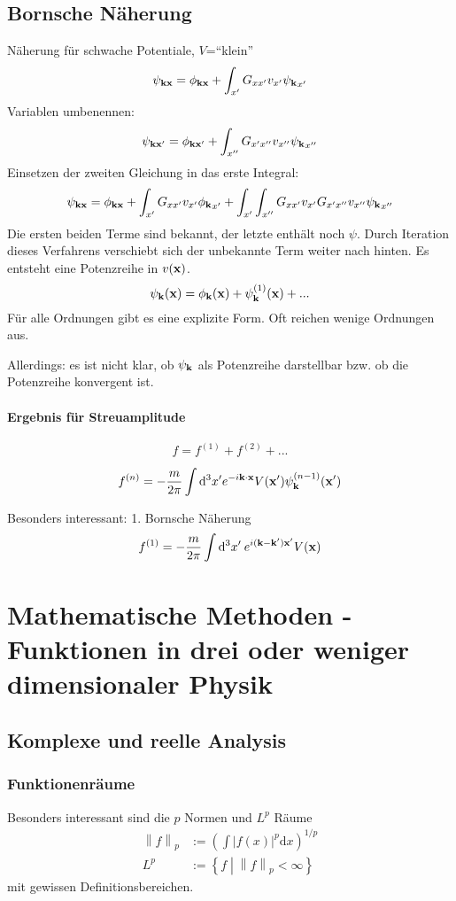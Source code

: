 \documentclass[11pt,a4paper]{report}
\newcommand{\norm}[1]{\left\lVert #1 \right\rVert}
\begin{document}
\subsection{Bornsche Näherung}

Näherung für schwache Potentiale, $V$=``klein''
$$\psi_{\mathbf{k} \mathbf{x} }=\phi_{\mathbf{k}\mathbf{x}}+\int_{x'}G_{xx'}v_{x'}{\psi_{\mathbf{k}}}_{x'}$$
Variablen umbenennen:
$$\psi_{\mathbf{k} \mathbf{x}' }=\phi_{\mathbf{k}\mathbf{x}'}+\int_{x''}G_{x'x''}v_{x''}{\psi_{\mathbf{k}}}_{x''}$$
Einsetzen der zweiten Gleichung in das erste Integral:
$$\psi_{\mathbf{k} \mathbf{x} }=\phi_{\mathbf{k}\mathbf{x}} + \int_{x'}G_{xx'}v_{x'}{\phi_{\mathbf{k}}}_{x'} +\int_{x'}\int_{x''}G_{xx'}v_{x'}G_{x'x''}v_{x''}{\psi_{\mathbf{k}}}_{x''}$$
Die ersten beiden Terme sind bekannt, der letzte enthält noch $\psi$. Durch Iteration dieses Verfahrens verschiebt sich der unbekannte Term weiter nach hinten. Es entsteht eine Potenzreihe in $v(\mathbf{x} )$.
$$\psi_{\mathbf{k}} (\mathbf{x})=\phi_{\mathbf{k}} (\mathbf{x} )+\psi_{\mathbf{k}}^{(1)}(\mathbf{x} )+...$$
Für alle Ordnungen gibt es eine explizite Form. Oft reichen wenige Ordnungen aus.\par 
Allerdings: es ist nicht klar, ob $\psi_{\mathbf{k}}$ als Potenzreihe darstellbar bzw. ob die Potenzreihe konvergent ist.
\paragraph{Ergebnis für Streuamplitude}

$$f=f^{(1)}+f^{(2)}+...$$

$$f^{(n)}=-\frac{m}{2\pi}\int\mathrm{d}^3x'e^{-i\mathbf{k}\cdot\mathbf{x} } V(\mathbf{x}')\psi_{\mathbf{k}}^{(n-1)}(\mathbf{x}')$$

Besonders interessant: 1. Bornsche Näherung
$$f^{(1)}=-\frac{m}{2\pi}\int\mathrm{d}^3x'\:e^{i(\mathbf{k} -\mathbf{k}')\mathbf{x}'}V(\mathbf{x} )$$

\section{Mathematische Methoden - Funktionen in drei oder weniger dimensionaler Physik}

\subsection{Komplexe und reelle Analysis}

\subsubsection{Funktionenräume}
Besonders interessant sind die $p$ Normen und $L^p$ Räume
\begin{align*}
    \norm{f}_p &:= (\int |f(x)|^p \mathrm{d}x)^{1/p} \\
    L^p & := \left\{ f \middle| \norm{f}_p < \infty \right\}
\end{align*}
mit gewissen Definitionsbereichen.
\end{document}
